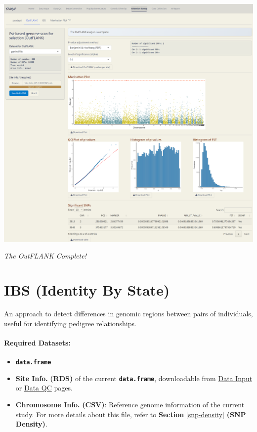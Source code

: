 \documentclass[
]{book}
\providecommand{\tightlist}{%
  \setlength{\itemsep}{0pt}\setlength{\parskip}{0pt}}
\begin{document}
\includegraphics{images/clipboard-1859743608.png}

\emph{The OutFLANK} \emph{Complete!}

\section{IBS (Identity By State)}\label{ibs-identity-by-state}

An approach to detect differences in genomic regions between pairs of individuals, useful for identifying pedigree relationships.

\paragraph*{Required Datasets:}\label{required-datasets-3}

\begin{itemize}
\tightlist
\item
  {\textbf{\texttt{data.frame}}}
\item
  \textbf{Site Info.} \textbf{(RDS)} of the current {\textbf{\texttt{data.frame}}}, downloadable from \ul{Data Input} or \ul{Data QC} pages.
\item
  \textbf{Chromosome Info.} \textbf{(CSV)}: Reference genome information of the current study. For more details about this file, refer to \textbf{Section} \ref{snp-density} \textbf{(SNP Density)}.
\end{itemize}
\end{document}
